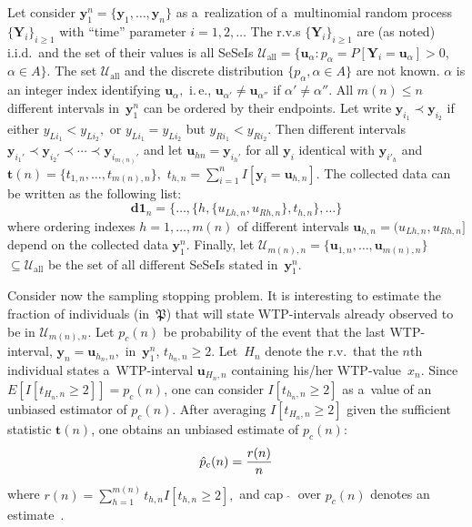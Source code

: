 \begin{multicols}{2}
    Let  consider $\mathbf{y}_1^n =\{ \mathbf{y}_1,
   \ldots , \mathbf{y}_n \}$ as a~realization of a~multinomial random
   process  $\{ \mathbf{Y}_i\}_{i\ge 1}$ with ``time'' parameter
   $i=1, 2,\ldots$ The r.v.s $\{ \mathbf{Y}_i\}_{i\ge 1}$ are (as noted) i.i.d.\
   and the set of    their values is  all SeSeIs $\mathcal{U}_{\mathrm{all}} =\{ \mathbf{
   u}_\alpha : p_\alpha =P[\mathbf{Y}_i =\mathbf{u}_\alpha ]>0$, $\alpha\in A\}.$
   The set  $\mathcal{U}_{\mathrm{all}}$ and the  discrete distribution $\{ p_\alpha,
   \alpha\in A\} $ are not known.  $\alpha$ is an integer index identifying $\mathbf{
    u}_\alpha, $ i.\,e., $ \mathbf{u}_{\alpha'}\not= \mathbf{u}_{\alpha''}$
    if $ \alpha'\not=\alpha''.$   All $m(n)\le n$ different intervals 
    in~$\mathbf{y}_1^n$ can be ordered
    by their endpoints. Let write $\mathbf{y}_{i_1}\prec  \mathbf{
    y}_{i_2}$ if either $ y_{L i_1}< y_{L i_2},$ or $ y_{L i_1}=
    y_{L i_2}$ but $ y_{R i_1}<  y_{R i_2}.$ Then different intervals 
    $ \mathbf{y}_{i_1'} \prec \mathbf{y}_{i_2'}\prec \cdots 
    \prec \mathbf{y}_{i_{m(n)}'}$ and let $\mathbf{u}_{h n}
    =\mathbf{y}_{i_h'} $ for all $\mathbf{y}_i$ identical with $\mathbf{y}_{i'_h}$ 
    and $\mathbf{t}(n) =\{ t_{1, n}, \ldots, t_{m(n), n}\},$  
    $t_{h, n} =\sum_{i=1}^n I [ \mathbf{y}_i =\mathbf{u}_{h, n}].$
   The collected data    can be written as the following list:
   $$
 \mathbf{d1}_n =\{ \ldots, \{ h, \{  u_{Lh, n} , u_{Rh, n}\}
 , t_{h, n} \} , \ldots \} 
   $$
   where ordering indexes $h=1, \ldots, m(n)$ of different intervals $\mathbf{u}_{h,
   n}=( u_{Lh, n}, u_{Rh, n}]$ depend on the collected data $\mathbf{y}_1^n.$ 
   Finally,  let $\mathcal{U}_{m(n), n}=\{ \mathbf{u}_{1, n} , \ldots , \mathbf{u}_{m(n), n}\}$\linebreak
$\subseteq\mathcal{U}_{\mathrm{all}}$ be the set of all different
SeSeIs stated in~$\mathbf{y}_1^n.$

Consider now the sampling stopping problem. It is 
interesting to estimate the fraction of individuals 
(in~$\mathfrak P$) that will state  WTP-intervals already observed to be in $\mathcal{U}_{m(n), n}.$
  Let $p_c (n)$ be probability of the event that the last
  WTP-interval, $\mathbf{y}_n =\mathbf{u}_{h_n, n},$ in~$\mathbf{y}_1^n$,
$t_{h_n, n} \ge 2.$ Let~$H_n$ denote the
  r.v.\ that the $n$th individual states a~WTP-interval $\mathbf{u}_{H_n, n}$ 
  containing his/her WTP-value~$x_n$.
   Since $E [ I[t_{H_n, n}\ge 2]] =p_c(n)$, one can consider  
   $I[t_{h_n, n} \ge 2]$ as a~value of an unbiased
   estimator of $p_c(n).$ After averaging $I[t_{H_n, n}\ge 2]$ given the 
   sufficient statistic $\mathbf{t}(n)$, one obtains an unbiased
    estimate of $ p_c(n)$:
$$
 \hat p_c (n) =\displaystyle\frac{\displaystyle r(n)\mathstrut}{\displaystyle n\mathstrut} 
 $$
where $r(n) =\sum_{h=1}^{m(n)} t_{h, n} I[t_{h, n}\ge 2],$ and
    cap $\, \hat{\,}\,$ over $p_c(n)$ denotes an estimate~\cite{BK:BK13}.


\end{multicols}

